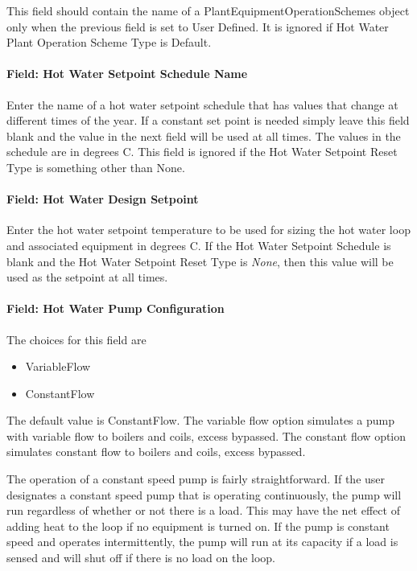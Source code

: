 This field should contain the name of a PlantEquipmentOperationSchemes object only when the previous field is set to User Defined. It is ignored if Hot Water Plant Operation Scheme Type is Default.

\paragraph{Field: Hot Water Setpoint Schedule Name}\label{field-hot-water-setpoint-schedule-name}

Enter the name of a hot water setpoint schedule that has values that change at different times of the year. If a constant set point is needed simply leave this field blank and the value in the next field will be used at all times. The values in the schedule are in degrees C. This field is ignored if the Hot Water Setpoint Reset Type is something other than None.

\paragraph{Field: Hot Water Design Setpoint}\label{field-hot-water-design-setpoint}

Enter the hot water setpoint temperature to be used for sizing the hot water loop and associated equipment in degrees C. If the Hot Water Setpoint Schedule is blank and the Hot Water Setpoint Reset Type is \emph{None}, then this value will be used as the setpoint at all times.

\paragraph{Field: Hot Water Pump Configuration}\label{field-hot-water-pump-configuration}

The choices for this field are

\begin{itemize}
\item
  VariableFlow
\item
  ConstantFlow
\end{itemize}

The default value is ConstantFlow. The variable flow option simulates a pump with variable flow to boilers and coils, excess bypassed. The constant flow option simulates constant flow to boilers and coils, excess bypassed.

The operation of a constant speed pump is fairly straightforward. If the user designates a constant speed pump that is operating continuously, the pump will run regardless of whether or not there is a load. This may have the net effect of adding heat to the loop if no equipment is turned on. If the pump is constant speed and operates intermittently, the pump will run at its capacity if a load is sensed and will shut off if there is no load on the loop.

